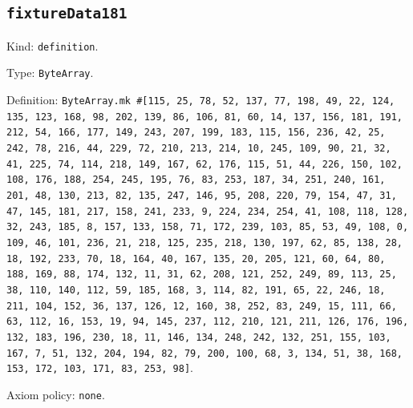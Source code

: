 \documentclass[11pt]{article}
\begin{document}
\subsection*{\texttt{fixtureData181}}
\noindent Kind: \texttt{definition}.\par
\noindent Type: \texttt{ByteArray}.\par
\noindent Definition: \texttt{ByteArray.mk \#[115, 25, 78, 52, 137, 77, 198, 49, 22, 124, 135, 123, 168, 98, 202, 139, 86, 106, 81, 60, 14, 137, 156, 181, 191, 212, 54, 166, 177, 149, 243, 207, 199, 183, 115, 156, 236, 42, 25, 242, 78, 216, 44, 229, 72, 210, 213, 214, 10, 245, 109, 90, 21, 32, 41, 225, 74, 114, 218, 149, 167, 62, 176, 115, 51, 44, 226, 150, 102, 108, 176, 188, 254, 245, 195, 76, 83, 253, 187, 34, 251, 240, 161, 201, 48, 130, 213, 82, 135, 247, 146, 95, 208, 220, 79, 154, 47, 31, 47, 145, 181, 217, 158, 241, 233, 9, 224, 234, 254, 41, 108, 118, 128, 32, 243, 185, 8, 157, 133, 158, 71, 172, 239, 103, 85, 53, 49, 108, 0, 109, 46, 101, 236, 21, 218, 125, 235, 218, 130, 197, 62, 85, 138, 28, 18, 192, 233, 70, 18, 164, 40, 167, 135, 20, 205, 121, 60, 64, 80, 188, 169, 88, 174, 132, 11, 31, 62, 208, 121, 252, 249, 89, 113, 25, 38, 110, 140, 112, 59, 185, 168, 3, 114, 82, 191, 65, 22, 246, 18, 211, 104, 152, 36, 137, 126, 12, 160, 38, 252, 83, 249, 15, 111, 66, 63, 112, 16, 153, 19, 94, 145, 237, 112, 210, 121, 211, 126, 176, 196, 132, 183, 196, 230, 18, 11, 146, 134, 248, 242, 132, 251, 155, 103, 167, 7, 51, 132, 204, 194, 82, 79, 200, 100, 68, 3, 134, 51, 38, 168, 153, 172, 103, 171, 83, 253, 98]}.\par
\noindent Axiom policy: \texttt{none}.\par
\end{document}
